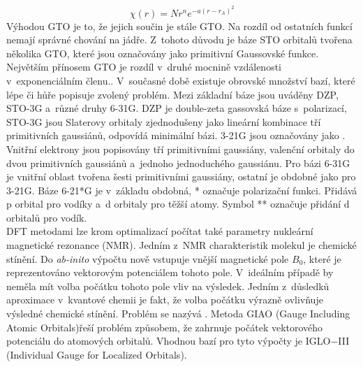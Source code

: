 \documentclass[
  printed, %
  table,   %
  lof,     %
  lot,     %
  oneside,
]{fithesis3}
\begin{document}
\begin{equation}
\chi(r) = Nr^n e^{-a(r-r_A)^2}
\end{equation}
 Výhodou GTO je to, že jejich součin je stále GTO. Na rozdíl od ostatních funkcí nemají správné chování na jádře. Z~tohoto důvodu je báze STO orbitalů tvořena několika GTO, které jsou označovány jako primitivní Gaussovské funkce. Největším přínosem GTO je rozdíl v~druhé mocnině vzdálenosti v~exponenciálním členu.\cite{lowe2011quantum}. 
 V~současné době existuje obrovské množství bazí, které lépe či hůře popisuje zvolený problém. Mezi základní báze jsou uváděny DZP, STO-3G a~různé druhy 6-31G. DZP je double-zeta gassovská báze s~polarizací, STO-3G jsou Slaterovy orbitaly zjednodušeny jako lineární kombinace tří primitivních gaussiánů, odpovídá minimální bázi. 3-21G jsou označovány jako . Vnitřní elektrony jsou popisovány tří primitivními gaussiány, valenční orbitaly  do dvou primitivních gaussiánů a~jednoho jednoduchého gaussiánu. Pro bázi 6-31G je vnitřní oblast tvořena šesti primitivními gaussiány, ostatní je obdobné jako pro 3-21G. Báze 6-21*G je v~základu obdobná, * označuje polarizační funkci. Přidává p orbital pro vodíky a~d orbitaly pro těžší atomy. Symbol ** označuje přidání d orbitalů pro vodík.\cite{lowe2011quantum} \\
 
 DFT metodami lze krom optimalizací počítat také parametry nukleární magnetické rezonance (NMR). Jedním z~NMR charakteristik molekul je chemické stínění. Do \textit{ab-inito} výpočtu nově vstupuje vnější magnetické pole $B_0$, které je reprezentováno vektorovým potenciálem tohoto pole. V~ideálním případě by neměla mít volba počátku tohoto pole vliv na výsledek. Jedním z~důsledků aproximace v~kvantové chemii je fakt, že volba počátku výrazně ovlivňuje výsledné chemické stínění. Problém se nazývá . Metoda GIAO (Gauge  Including Atomic Orbitals)řeší problém způsobem, že zahrnuje počátek vektorového potenciálu do atomových orbitalů. Vhodnou bazí pro tyto výpočty je IGLO$-$III (Individual Gauge for Localized Orbitals).\cite{Standara2006thesis} \cite{g09}
\end{document}
